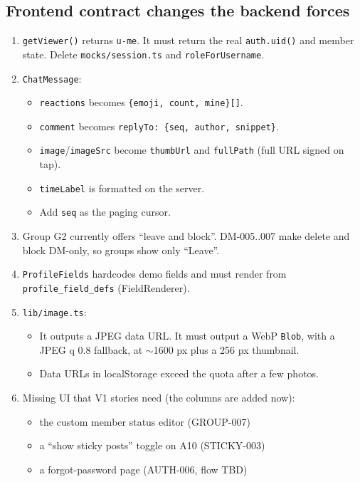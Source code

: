 \documentclass[11pt,a4paper]{article}
\newcommand{\code}[1]{\texttt{\small #1}}
\begin{document}
\subsection{Frontend contract changes the backend forces}\label{sec:contract}
\begin{enumerate}
  \item \code{getViewer()} returns \code{u-me}. It must return the real \code{auth.uid()} and member state.
        Delete \code{mocks/session.ts} and \code{roleForUsername}.
  \item \code{ChatMessage}:
        \begin{itemize}
          \item \code{reactions} becomes \code{\{emoji, count, mine\}[]}.
          \item \code{comment} becomes \code{replyTo: \{seq, author, snippet\}}.
          \item \code{image}/\code{imageSrc} become \code{thumbUrl} and \code{fullPath} (full URL signed on tap).
          \item \code{timeLabel} is formatted on the server.
          \item Add \code{seq} as the paging cursor.
        \end{itemize}
  \item Group G2 currently offers ``leave and block''. DM-005..007 make delete and block DM-only, so groups show only
        ``Leave''.
  \item \code{ProfileFields} hardcodes demo fields and must render from \code{profile\_field\_defs} (FieldRenderer).
  \item \code{lib/image.ts}:
        \begin{itemize}
          \item It outputs a JPEG data URL. It must output a WebP \code{Blob}, with a JPEG q 0.8 fallback, at
                $\sim$1600 px plus a 256 px thumbnail.
          \item Data URLs in localStorage exceed the quota after a few photos.
        \end{itemize}
  \item Missing UI that V1 stories need (the columns are added now):
        \begin{itemize}
          \item the custom member status editor (GROUP-007)
          \item a ``show sticky posts'' toggle on A10 (STICKY-003)
          \item a forgot-password page (AUTH-006, flow TBD)
        \end{itemize}
\end{enumerate}
\end{document}

